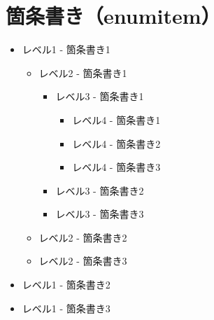 \section{箇条書き（enumitem）}

\begin{itemize}[leftmargin=3cm]
    \item レベル1 - 箇条書き1
    \begin{itemize}
        \item レベル2 - 箇条書き1
        \begin{itemize}
            \item レベル3 - 箇条書き1
            \begin{itemize}
                \item レベル4 - 箇条書き1
                \item レベル4 - 箇条書き2
                \item レベル4 - 箇条書き3
            \end{itemize}
            \item レベル3 - 箇条書き2
            \item レベル3 - 箇条書き3
        \end{itemize}
        \item レベル2 - 箇条書き2
        \item レベル2 - 箇条書き3
    \end{itemize}
    \item レベル1 - 箇条書き2
    \item レベル1 - 箇条書き3
\end{itemize}

